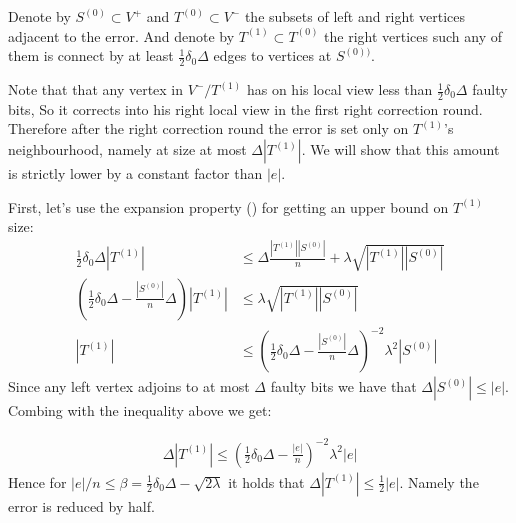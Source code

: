 \documentclass{beamer}
\begin{document}
\begin{frame}

  Denote by $S^{(0)} \subset V^{+}$ and  $T^{(0)} \subset V^{-}$ the subsets of left and right vertices adjacent to the error. And denote by $T^{(1)} \subset T^{(0)}$ the right vertices such any of them is connect by at least $\frac{1}{2}\delta_{0}\Delta$ edges to vertices at $S^{(0))}$. 

  Note that that any vertex in $V^{-}/T^{(1)}$ has on his local view less than $\frac{1}{2}\delta_{0}\Delta$ faulty bits, So it corrects into his right local view in the first right correction round. Therefore after the right correction round the error is set only on $T^{(1)}$'s neighbourhood, namely at size at most $\Delta|T^{(1)}|$.  We will show that this amount is strictly lower by a constant factor than $|e|$. 

\end{frame}
\begin{frame}

  First, let's use the expansion property () for getting an upper bound on $T^{(1)}$ size: \begin{equation*}
  \begin{split} 
    \frac{1}{2}\delta_{0}\Delta |T^{(1)}| & \le \Delta \frac{|T^{(1)}||S^{(0)}|}{n} + \lambda\sqrt{|T^{(1)}||S^{(0)}|} \\ 
  \left( \frac{1}{2} \delta_{0} \Delta - \frac{|S^{(0)}|}{n} \Delta \right) |T^{(1)}| & \le \lambda \sqrt{|T^{(1)}||S^{(0)}|} \\ 
|T^{(1)}| & \le \left( \frac{1}{2} \delta_{0} \Delta - \frac{|S^{(0)}|}{n} \Delta \right)^{-2}\lambda^{2} |S^{(0)}| 
  \end{split}
\end{equation*}
Since any left vertex adjoins to at most $\Delta$ faulty bits we have that $\Delta|S^{(0)}| \le |e|$. Combing with the inequality above we get:  

\begin{equation*}
  \begin{split}
    \Delta |T^{(1)}| \le \left( \frac{1}{2} \delta_{0} \Delta - \frac{|e|}{n} \right)^{-2}\lambda^{2} |e|
  \end{split}
\end{equation*}
Hence for $|e|/n \le \beta =  \frac{1}{2} \delta_{0} \Delta - \sqrt{2\lambda}$ it holds that $\Delta|T^{(1)}| \le \frac{1}{2}|e|$. Namely the error is reduced by half.  




\end{frame}
\end{document}
